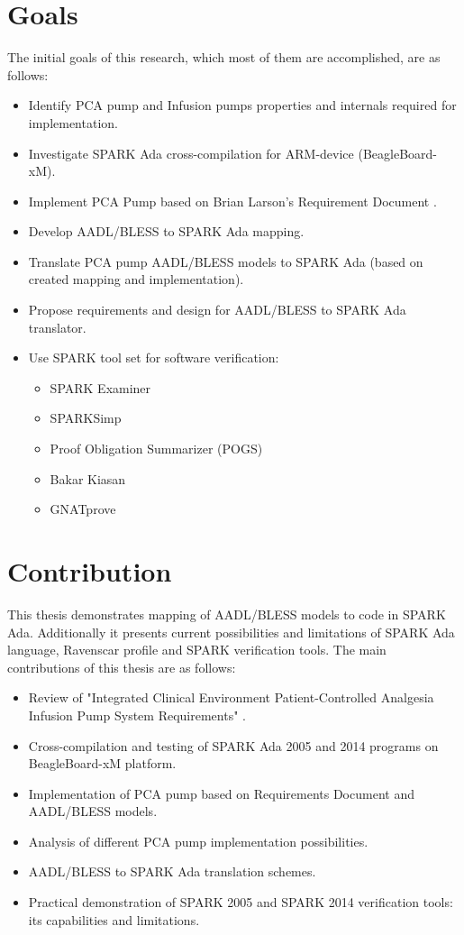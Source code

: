 \section{Goals}
\label{introduction:goals}
The initial goals of this research, which most of them are accomplished, are as follows:
\begin{itemize}
	\item Identify PCA pump and Infusion pumps properties and internals required for implementation.
	\item Investigate SPARK Ada cross-compilation for ARM-device (BeagleBoard-xM).
	\item Implement PCA Pump based on Brian Larson's Requirement Document \cite{OpenSourcePCAPump:Paper}.
	\item Develop AADL/BLESS to SPARK Ada mapping.
	\item Translate PCA pump AADL/BLESS models to SPARK Ada (based on created mapping and implementation).
	\item Propose requirements and design for AADL/BLESS to SPARK Ada translator.
	\item Use SPARK tool set for software verification:
		\begin{itemize}
			\item SPARK Examiner
			\item SPARKSimp
			\item Proof Obligation Summarizer (POGS)
			\item Bakar Kiasan
			\item GNATprove
		\end{itemize}
\end{itemize}


\section{Contribution}
\label{introduction:contribution}
This thesis demonstrates mapping of AADL/BLESS models to code in SPARK Ada. Additionally it presents current possibilities and limitations of SPARK Ada language, Ravenscar profile and SPARK verification tools. The main contributions of this thesis are as follows:
\begin{itemize}
	\item Review of "Integrated Clinical Environment Patient-Controlled Analgesia Infusion Pump System Requirements" \cite{PcaReq}.
	\item Cross-compilation and testing of SPARK Ada 2005 and 2014 programs on BeagleBoard-xM platform.
	\item Implementation of PCA pump based on Requirements Document \cite{PcaReq} and AADL/BLESS models.
	\item Analysis of different PCA pump implementation possibilities.
	\item AADL/BLESS to SPARK Ada translation schemes.
	\item Practical demonstration of SPARK 2005 and SPARK 2014 verification tools: its capabilities and limitations.
\end{itemize}


